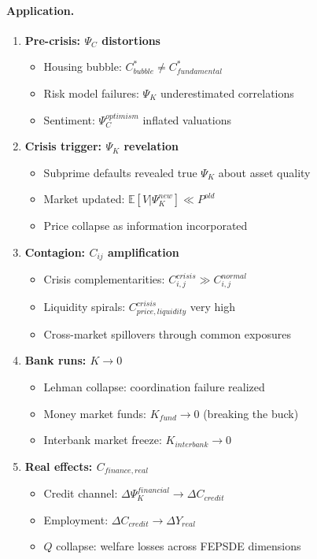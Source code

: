 \paragraph{Application.}

\begin{enumerate}
\item \textbf{Pre-crisis: $\Psi_C$ distortions}
    \begin{itemize}
    \item Housing bubble: $C^*_{bubble} \neq C^*_{fundamental}$
    \item Risk model failures: $\Psi_K$ underestimated correlations
    \item Sentiment: $\Psi_C^{optimism}$ inflated valuations
    \end{itemize}

\item \textbf{Crisis trigger: $\Psi_K$ revelation}
    \begin{itemize}
    \item Subprime defaults revealed true $\Psi_K$ about asset quality
    \item Market updated: $\mathbb{E}[V | \Psi_K^{new}] \ll P^{old}$
    \item Price collapse as information incorporated
    \end{itemize}

\item \textbf{Contagion: $C_{ij}$ amplification}
    \begin{itemize}
    \item Crisis complementarities: $C_{i,j}^{crisis} \gg C_{i,j}^{normal}$
    \item Liquidity spirals: $C_{price, liquidity}^{crisis}$ very high
    \item Cross-market spillovers through common exposures
    \end{itemize}

\item \textbf{Bank runs: $K \to 0$}
    \begin{itemize}
    \item Lehman collapse: coordination failure realized
    \item Money market funds: $K_{fund} \to 0$ (breaking the buck)
    \item Interbank market freeze: $K_{interbank} \to 0$
    \end{itemize}

\item \textbf{Real effects: $C_{finance, real}$}
    \begin{itemize}
    \item Credit channel: $\Delta \Psi_K^{financial} \to \Delta C_{credit}$
    \item Employment: $\Delta C_{credit} \to \Delta Y_{real}$
    \item $Q$ collapse: welfare losses across FEPSDE dimensions
    \end{itemize}
\end{enumerate}

